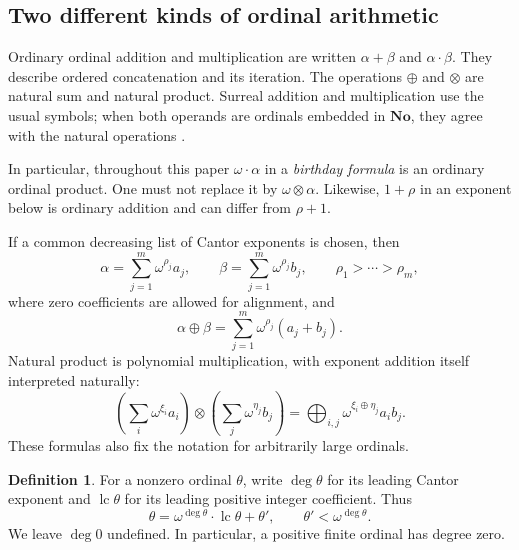 \documentclass[11pt,letterpaper]{article}
\theoremstyle{definition}
\newtheorem{definition}[theorem]{Definition}
\theoremstyle{remark}
\newcommand{\No}{\mathbf{No}}
\newcommand{\ns}{\mathbin{\oplus}}
\newcommand{\np}{\mathbin{\otimes}}
\DeclareMathOperator{\lc}{lc}
\begin{document}
\subsection{Two different kinds of ordinal arithmetic}
Ordinary ordinal addition and multiplication are written \(\alpha+\beta\)
and \(\alpha\cdot\beta\). They describe ordered concatenation and its
iteration. The operations \(\ns\) and \(\np\) are natural sum and
natural product. Surreal addition and multiplication use the usual symbols;
when both operands are ordinals embedded in \(\No\), they agree with the
natural operations \cite[Section~6]{Berarducci}.

In particular, throughout this paper \(\omega\cdot\alpha\) in a
\emph{birthday formula} is an ordinary ordinal product. One must not replace
it by \(\omega\np\alpha\). Likewise, \(1+\rho\) in an exponent below
is ordinary addition and can differ from \(\rho+1\).

If a common decreasing list of Cantor exponents is chosen, then
\[
 \alpha=\sum_{j=1}^m\omega^{\rho_j}a_j,
 \qquad
 \beta=\sum_{j=1}^m\omega^{\rho_j}b_j,
 \qquad \rho_1>\cdots>\rho_m,
\]
where zero coefficients are allowed for alignment, and
\begin{equation}\label{eq:natural-sum}
 \alpha\ns\beta=\sum_{j=1}^m\omega^{\rho_j}(a_j+b_j).
\end{equation}
Natural product is polynomial multiplication, with exponent addition
itself interpreted naturally:
\begin{equation}\label{eq:natural-product}
 \left(\sum_i\omega^{\xi_i}a_i\right)
 \np\left(\sum_j\omega^{\eta_j}b_j\right)
 =\mathop{\bigoplus}_{i,j}\omega^{\xi_i\ns\eta_j}a_i b_j.
\end{equation}
These formulas also fix the notation for arbitrarily large ordinals.

\begin{definition}
For a nonzero ordinal \(\theta\), write \(\deg\theta\) for its leading
Cantor exponent and \(\lc\theta\) for its leading positive integer
coefficient. Thus
\[
 \theta=\omega^{\deg\theta}\cdot\lc\theta+\theta',
 \qquad \theta'<\omega^{\deg\theta}.
\]
We leave \(\deg0\) undefined. In particular, a positive finite ordinal
has degree zero.
\end{definition}
\end{document}
